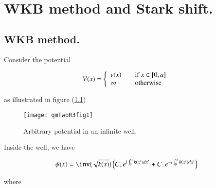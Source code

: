 %
%

\chapter{WKB method and Stark shift.}
\label{chap:qmTwoR3}
{}
\date{Oct 28, 2011}

\beginArtWithToc

%
%
\section{WKB method.}

Consider the potential

\begin{equation}\label{eqn:qmTwoR3:10}
V(x) = 
\left\{
\begin{array}{l l}
v(x) & \quad \mbox{if $x \in [0,a]$} \\
\infty & \quad \mbox{otherwise} \\
\end{array}
\right.
\end{equation}

as illustrated in figure (\ref{fig:qmTwoR3:qmTwoR3fig1})
\begin{figure}[htp]
   \centering
   \texttt{[image: qmTwoR3fig1]}
   \caption{Arbitrary potential in an infinite well.}\label{fig:qmTwoR3:qmTwoR3fig1}
\end{figure}

Inside the well, we have

\begin{equation}\label{eqn:qmTwoR3:30}
\psi(x) = \inv{\sqrt{k(x)}} \left( 
C_{+} e^{i \int_0^x k(x') dx'}
+C_{-} e^{-i \int_0^x k(x') dx'}
\right)
\end{equation}

where

